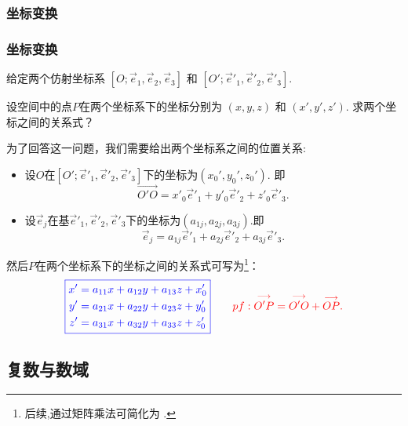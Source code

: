 \subsubsection{坐标变换}
\begin{frame}\frametitle{坐标变换}
给定两个仿射坐标系 $[O;\vec{e}_1,\vec{e}_2,\vec{e}_3]$ 和 $[O';\vec{e}'_1,\vec{e}'_2,\vec{e}'_3]$.
\pp
\begin{question}
设空间中的点$P$在两个坐标系下的坐标分别为 $(x,y,z)$ 和 $(x',y',z')$. 求两个坐标之间的关系式？
\end{question}
\pp
为了回答这一问题，我们需要给出两个坐标系之间的位置关系:
\pp
\begin{itemize}
\item 设$O$在$[O';\vec{e}'_1,\vec{e}'_2,\vec{e}'_3]$下的坐标为$(x_0',y_0',z_0')$. 即
\[\overset{\longrightarrow}{O'O} = x'_0\vec{e}'_1+ y'_0\vec{e}'_2 + z'_0\vec{e}'_3.\]
\item \pp  设$\vec{e}_j$在基$\vec{e}'_1,\vec{e}'_2,\vec{e}'_3$下的坐标为$(a_{1j},a_{2j},a_{3j})$.即
\[ \vec{e}_j = a_{1j}\vec{e}'_1+ a_{2j}\vec{e}'_2 + a_{3j}\vec{e}'_3.\]
\end{itemize}
\pp
然后$P$在两个坐标系下的坐标之间的关系式可写为\footnote{后续,通过矩阵乘法可简化为 .}：
\begin{equation*}
\blue{\boxed{
\begin{split}
x' &= a_{11}x+a_{12}y+a_{13}z+x_0'\\
y' &= a_{21}x+a_{22}y+a_{23}z+y_0'\\
z' &= a_{31}x+a_{32}y+a_{33}z+z_0'\\
\end{split}
}}\qquad
\pp  \red{pf: \overset{\longrightarrow}{O'P} = \overset{\longrightarrow}{O'O}+\overset{\longrightarrow}{OP}.}
\end{equation*}
\end{frame}







\subsection{复数与数域}





